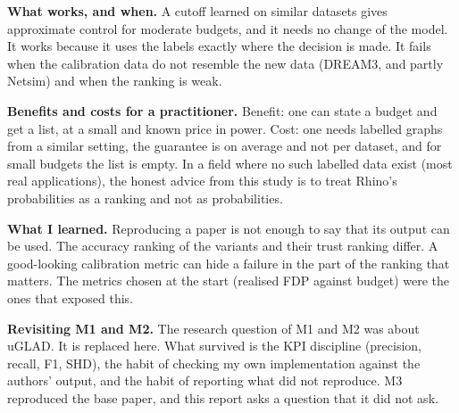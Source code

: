 \documentclass[10pt]{article}
\begin{document}
\textbf{What works, and when.} A cutoff learned on similar datasets gives approximate control for moderate budgets, and it needs no change of the model. It works because it uses the labels exactly where the decision is made. It fails when the calibration data do not resemble the new data (DREAM3, and partly Netsim) and when the ranking is weak.

\textbf{Benefits and costs for a practitioner.} Benefit: one can state a budget and get a list, at a small and known price in power. Cost: one needs labelled graphs from a similar setting, the guarantee is on average and not per dataset, and for small budgets the list is empty. In a field where no such labelled data exist (most real applications), the honest advice from this study is to treat Rhino's probabilities as a ranking and not as probabilities.

\textbf{What I learned.} Reproducing a paper is not enough to say that its output can be used. The accuracy ranking of the variants and their trust ranking differ. A good-looking calibration metric can hide a failure in the part of the ranking that matters. The metrics chosen at the start (realised FDP against budget) were the ones that exposed this.

\textbf{Revisiting M1 and M2.} The research question of M1 and M2 was about uGLAD. It is replaced here. What survived is the KPI discipline (precision, recall, F1, SHD), the habit of checking my own implementation against the authors' output, and the habit of reporting what did not reproduce. M3 reproduced the base paper, and this report asks a question that it did not ask.
\end{document}
